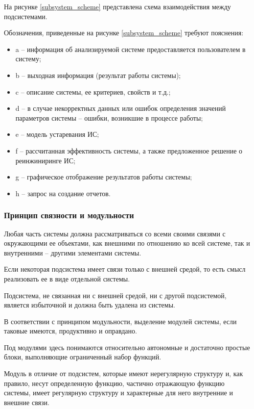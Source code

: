 На рисунке \ref{subsystem_scheme} представлена схема взаимодействия между подсистемами.


Обозначения, приведенные на рисунке \ref{subsystem_scheme} требуют пояснения:
\begin{itemize}
    \item a – информация об анализируемой системе предоставляется пользователем в систему;
    \item b – выходная информация (результат работы системы);
    \item c – описание системы, ее критериев, свойств и т.д.;
    \item d – в случае некорректных данных или ошибок определения значений параметров системы – ошибки, возникшие в процессе работы;
    \item e – модель устаревания ИС;
    \item f – рассчитанная эффективность системы, а также предложенное решение о реинжиниринге ИС;
    \item g – графическое отображение результатов работы системы;
    \item h – запрос на создание отчетов.
\end{itemize}

\subsubsection{Принцип связности и модульности}
Любая часть системы должна рассматриваться со всеми своими связями с окружающими ее объектами, как внешними по отношению ко всей системе, так и внутренними – другими элементами системы.

Если некоторая подсистема имеет связи только с внешней средой, то есть смысл реализовать ее в виде отдельной системы.

Подсистема, не связанная ни с внешней средой, ни с другой подсистемой, является избыточной и должна быть удалена из системы.

В соответствии с принципом модульности, выделение модулей системы, если таковые имеются, продуктивно и оправдано.

Под модулями здесь понимаются относительно автономные и достаточно простые блоки, выполняющие ограниченный набор функций.

Модуль в отличие от подсистем, которые имеют нерегулярную структуру и, как правило, несут определенную функцию, частично отражающую функцию системы, имеет регулярную структуру и характерные для него внутренние и внешние связи.

